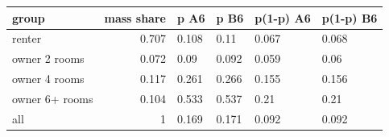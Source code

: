 \begingroup\small
\setlength{\tabcolsep}{3pt}
\renewcommand{\arraystretch}{1.04}
\begin{tabularx}{\linewidth}{XrXXXX}
\toprule
group & mass share & p A6 & p B6 & p(1-p) A6 & p(1-p) B6 \\
\midrule
renter & 0.707 & 0.108 & 0.11 & 0.067 & 0.068 \\
owner 2 rooms & 0.072 & 0.09 & 0.092 & 0.059 & 0.06 \\
owner 4 rooms & 0.117 & 0.261 & 0.266 & 0.155 & 0.156 \\
owner 6+ rooms & 0.104 & 0.533 & 0.537 & 0.21 & 0.21 \\
all & 1 & 0.169 & 0.171 & 0.092 & 0.092 \\
\bottomrule
\end{tabularx}
\endgroup
